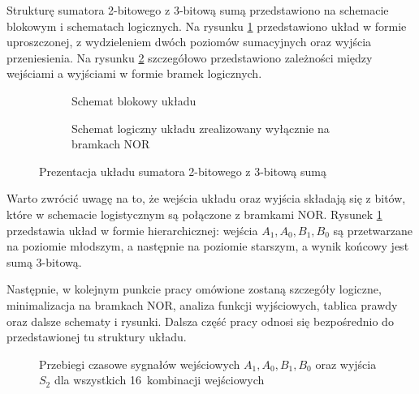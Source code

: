 \documentclass[11pt]{article}
\begin{document}
Strukturę sumatora 2-bitowego z 3-bitową sumą przedstawiono na schemacie blokowym i schematach logicznych. Na rysunku \ref{fig:schemat_bloku} przedstawiono układ w formie uproszczonej, z wydzieleniem dwóch poziomów sumacyjnych oraz wyjścia przeniesienia. Na rysunku \ref{fig:schemat_loiczny} szczegółowo przedstawiono zależności między wejściami a wyjściami w formie bramek logicznych.

\begin{figure}[h]
\centering
\begin{subfigure}[b]{0.97\linewidth}
    \centering
    \resizebox{\linewidth}{!}{\RysSchematBlokowy}
    \caption{Schemat blokowy układu}
    \label{fig:schemat_bloku}
\end{subfigure}

\begin{subfigure}[b]{0.97\linewidth}
    \centering
    \resizebox{\linewidth}{!}{\RysSchematNOR}
    \caption{Schemat logiczny układu zrealizowany wyłącznie na bramkach NOR}
    \label{fig:schemat_loiczny}
\end{subfigure}
\caption{Prezentacja układu sumatora 2-bitowego z 3-bitową sumą}
\label{fig:schematy_glowne}
\end{figure}

Warto zwrócić uwagę na to, że wejścia układu oraz wyjścia składają się z bitów, które w schemacie logistycznym są połączone z bramkami NOR. Rysunek \ref{fig:schemat_bloku} przedstawia układ w formie hierarchicznej: wejścia \(A_1, A_0, B_1, B_0\) są przetwarzane na poziomie młodszym, a następnie na poziomie starszym, a wynik końcowy jest sumą 3-bitową.

Następnie, w kolejnym punkcie pracy omówione zostaną szczegóły logiczne, minimalizacja na bramkach NOR, analiza funkcji wyjściowych, tablica prawdy oraz dalsze schematy i rysunki. Dalsza część pracy odnosi się bezpośrednio do przedstawionej tu struktury układu.

\begin{figure}[h]
\centering
\resizebox{0.85\linewidth}{!}{\RysPrzebiegi}
\caption{Przebiegi czasowe sygnałów wejściowych $A_1, A_0, B_1, B_0$ oraz wyjścia $S_2$ dla wszystkich 16~kombinacji wejściowych}
\label{fig:przejscie}
\end{figure}
\end{document}
